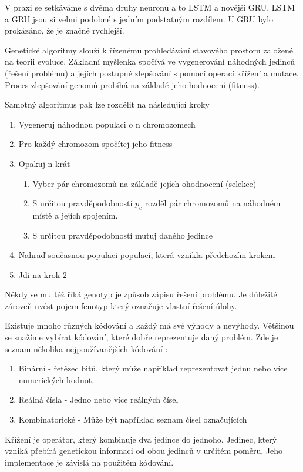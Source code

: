 V praxi se setkáváme s dvěma druhy neuronů a to LSTM a novější GRU. LSTM a GRU jsou si velmi podobné s jedním podstatným rozdílem. U GRU bylo prokázáno, že je značně rychlejší. 


Genetické algoritmy slouží k řízenému prohledávání stavového prostoru založené na teorii evoluce. 
Základní myšlenka spočívá ve vygenerování náhodných jedinců (řešení problému) a jejích postupné zlepšování s pomocí operací křížení a mutace. Proces zlepšování genomů probíhá na základě jeho hodnocení (fitness).

Samotný algoritmus pak lze rozdělit na následující kroky \cite[s.~12]{geneticAlgorithms}

\begin{enumerate}
	\item Vygeneruj náhodnou populaci o n chromozomech
	\item Pro každý chromozom spočítej jeho fitness
	\item Opakuj n krát
	\begin{enumerate}
		\item Vyber pár chromozomů na základě jejích ohodnocení (selekce)
		\item S určitou pravděpodobností $p_c$ rozděl pár chromozomů na náhodném místě a jejích spojením.
		\item S určitou pravděpodobností mutuj daného jedince
	\end{enumerate}
	\item Nahraď současnou populaci populací, která vznikla předchozím krokem
	\item Jdi na krok 2
\end{enumerate}

Někdy se mu též říká genotyp je způsob zápisu řešení problému. Je důležité zároveň uvést pojem fenotyp který označuje vlastní řešení úlohy.

Existuje mnoho různých kódování a každý má své výhody a nevýhody. Většinou se snažíme vybírat kódování, které dobře reprezentuje daný problém. Zde je seznam několika nejpoužívanějších kódování \cite[s.~42-43]{geneticCZ}:
\begin{enumerate}
	\item Binární - řetězec bitů, který může například reprezentovat jednu nebo více numerických hodnot. 
	\item Reálná čísla - Jedno nebo více reálných čísel
	\item Kombinatorické - Může být například seznam čísel označujících 
\end{enumerate}
Křížení je operátor, který kombinuje dva jedince do jednoho. Jedinec, který vzniká přebírá genetickou informaci od obou jedinců v určitém poměru. Jeho implementace je závislá na použitém kódování. 

